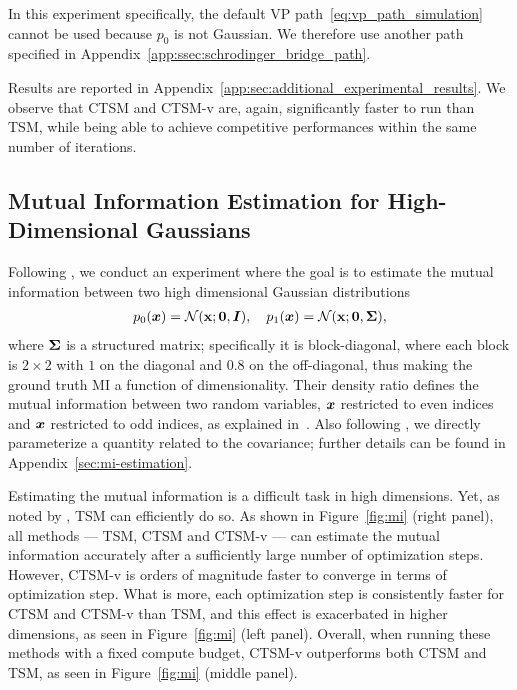 In this experiment specifically, the default VP path~\eqref{eq:vp_path_simulation} cannot be used because $p_0$ is not Gaussian. We therefore use another path specified in Appendix~\ref{app:ssec:schrodinger_bridge_path}.

Results are reported in Appendix~\ref{app:sec:additional_experimental_results}. We observe that CTSM and CTSM-v are, again, significantly faster to run than TSM, while being able to achieve competitive performances within the same number of iterations.

\subsection{Mutual Information Estimation for High-Dimensional Gaussians}

Following \citet{Rhodes2020,choi2022densityratio}, we conduct an experiment where the goal is to estimate the mutual information between two high dimensional Gaussian distributions
\begin{align}
    p_0({\bm{x}}) 
    = 
    \mathcal{N}(\operatorname{\mathbf{x}}; \mathbf{0}, {\bm{I}})
    , \quad
    p_1({\bm{x}}) 
    = 
    \mathcal{N}(\operatorname{\mathbf{x}}; \mathbf{0}, {\bm{\Sigma}}),
\end{align}
where ${\bm{\Sigma}}$ is a structured matrix; specifically it is block-diagonal, where each block is $2 \times 2$ with $1$ on the diagonal and $0.8$ on the off-diagonal, thus making the ground truth MI a function of dimensionality. Their density ratio defines the mutual information between two random variables, ${\bm{x}}$ restricted to even indices and ${\bm{x}}$ restricted to odd indices, as explained in~\citet[Appendix D]{Rhodes2020}. Also following \citet{Rhodes2020,choi2022densityratio}, we directly parameterize a quantity related to the covariance; further details can be found in Appendix~\ref{sec:mi-estimation}.

Estimating the mutual information is a difficult task in high dimensions. Yet, as noted by \citet{choi2022densityratio}, TSM can efficiently do so. As shown in Figure~\ref{fig:mi} (right panel), all methods --- TSM, CTSM and CTSM-v --- can estimate the mutual information accurately after a sufficiently large number of optimization steps. However, CTSM-v is orders of magnitude faster to converge in terms of optimization step. What is more, each optimization step is consistently faster for CTSM and CTSM-v than TSM, and this effect is exacerbated in higher dimensions, as seen in Figure~\ref{fig:mi} (left panel). Overall, when running these methods with a fixed compute budget,   CTSM-v outperforms both CTSM and TSM, as seen in Figure~\ref{fig:mi} (middle panel). 

